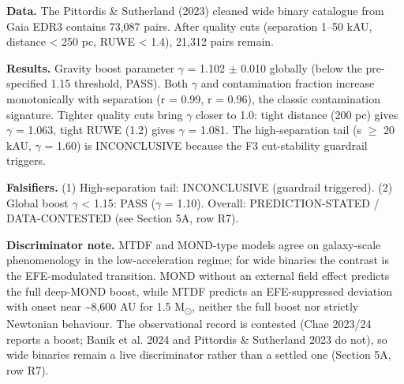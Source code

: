 \documentclass[11pt,a4paper]{article}
\begin{document}
\textbf{Data.} The Pittordis \& Sutherland (2023) cleaned wide binary catalogue from Gaia EDR3 contains 73,087 pairs. After quality cuts (separation 1--50 kAU, distance < 250 pc, RUWE < 1.4), 21,312 pairs remain.

\textbf{Results.} Gravity boost parameter $\gamma$ = 1.102 $\pm$ 0.010 globally (below the pre-specified 1.15 threshold, PASS). Both $\gamma$ and contamination fraction increase monotonically with separation (r = 0.99, r = 0.96), the classic contamination signature. Tighter quality cuts bring $\gamma$ closer to 1.0: tight distance (200 pc) gives $\gamma$ = 1.063, tight RUWE (1.2) gives $\gamma$ = 1.081. The high-separation tail (s $\ge$ 20 kAU, $\gamma$ = 1.60) is INCONCLUSIVE because the F3 cut-stability guardrail triggers.

\textbf{Falsifiers.} (1) High-separation tail: INCONCLUSIVE (guardrail triggered). (2) Global boost $\gamma$ < 1.15: PASS ($\gamma$ = 1.10). Overall: PREDICTION-STATED / DATA-CONTESTED (see Section 5A, row R7).

\textbf{Discriminator note.} MTDF and MOND-type models agree on galaxy-scale phenomenology in the low-acceleration regime; for wide binaries the contrast is the EFE-modulated transition. MOND without an external field effect predicts the full deep-MOND boost, while MTDF predicts an EFE-suppressed deviation with onset near \~{}8,600 AU for 1.5 M\textsubscript{$\odot$}, neither the full boost nor strictly Newtonian behaviour. The observational record is contested (Chae 2023/\allowbreak{}24 reports a boost; Banik et al. 2024 and Pittordis \& Sutherland 2023 do not), so wide binaries remain a live discriminator rather than a settled one (Section 5A, row R7).
\end{document}
